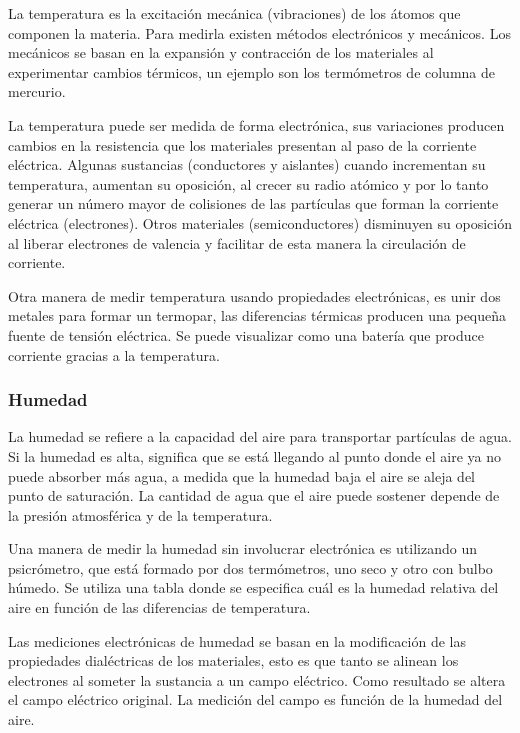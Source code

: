 			La temperatura es la excitación mecánica (vibraciones) de los átomos que componen la materia. Para medirla existen métodos electrónicos y mecánicos. Los mecánicos se basan en la expansión y contracción de los materiales al experimentar cambios térmicos, un ejemplo son los termómetros de columna de mercurio.
		
			La temperatura puede ser medida de forma electrónica, sus variaciones producen cambios en la resistencia que los materiales presentan al paso de la corriente eléctrica. Algunas sustancias (conductores y aislantes) cuando incrementan su temperatura, aumentan su oposición, al crecer su radio atómico y por lo tanto generar un número mayor de colisiones de las partículas que forman la corriente eléctrica (electrones). Otros materiales (semiconductores) disminuyen su oposición al liberar electrones de valencia y facilitar de esta manera la circulación de corriente.
		
			Otra manera de medir temperatura usando propiedades electrónicas, es unir dos metales para formar un termopar, las diferencias térmicas producen una pequeña fuente de tensión eléctrica. Se puede visualizar como una batería que produce corriente gracias a la temperatura.
		
		\subsubsection{Humedad}
		
			La humedad se refiere a la capacidad del aire para transportar partículas de agua. Si la humedad es alta, significa que se está llegando al punto donde el aire ya no puede absorber más agua, a medida que la humedad baja el aire se aleja del punto de saturación. La cantidad de agua que el aire puede sostener depende de la presión atmosférica y de la temperatura.
		
			Una manera de medir la humedad sin involucrar electrónica es utilizando un psicrómetro, que está formado por dos termómetros, uno seco y otro con bulbo húmedo. Se utiliza una tabla donde se especifica cuál es la humedad relativa del aire en función de las diferencias de temperatura.
		
			Las mediciones electrónicas de humedad se basan en la modificación de las propiedades dialéctricas de los materiales, esto es que tanto se alinean los electrones al someter la sustancia a un campo eléctrico. Como resultado se altera el campo eléctrico original. La medición del campo es función de la humedad del aire.
		
